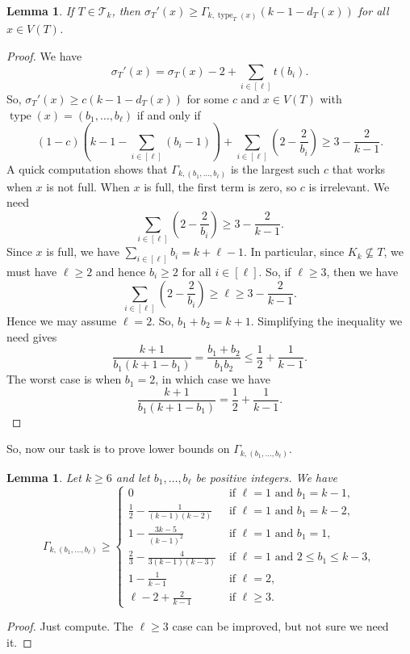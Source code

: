 \documentclass[12pt]{article}
\theoremstyle{plain}
\newtheorem{lem}[thm]{Lemma}
\theoremstyle{definition}
\theoremstyle{remark}
\newcommand{\fancy}[1]{\mathcal{#1}}
\newcommand{\T}{\fancy{T}}
\newcommand{\irange}[1]{\left[#1\right]}
\newcommand{\parens}[1]{\left( #1 \right)}
\newcommand{\type}{\operatorname{type}}
\begin{document}
\begin{lem}\label{PrimeGammaBound}
	If $T \in \T_k$, then $\sigma_T'(x) \ge \Gamma_{k,\type_T(x)}\parens{k - 1 - d_T(x)}$ for all $x \in V(T)$.
\end{lem}
\begin{proof}
	We have
	\[\sigma_T'(x) = \sigma_T(x) - 2 + \sum_{i \in \irange{\ell}}t(b_i).\]
	So, $\sigma_T'(x) \ge c\parens{k - 1 - d_T(x)}$ for some $c$ and $x \in V(T)$ with $\type(x) = (b_1, \ldots, b_\ell)$ if and only if
	\[(1-c)\parens{k - 1 - \sum_{i\in\irange{\ell}} (b_i-1)} + \sum_{i \in \irange{\ell}} \parens{2 - \frac{2}{b_i}} \ge 3 - \frac{2}{k-1}.\]
	A quick computation shows that $\Gamma_{k,(b_1,\ldots,b_{\ell})}$ is the largest such $c$ that works when $x$ is not full.  When $x$ is full, the first term is zero, so $c$ is irrelevant. We need
	\[\sum_{i \in \irange{\ell}} \parens{2 - \frac{2}{b_i}} \ge 3 - \frac{2}{k-1}.\]
	Since $x$ is full, we have $\sum_{i \in \irange{\ell}} b_i = k + \ell - 1$. In particular, since $K_k \not \subseteq T$, we must have $\ell \ge 2$ and hence $b_i \ge 2$ for all $i \in \irange{\ell}$.  So, if $\ell \ge 3$, then we have
	\[\sum_{i \in \irange{\ell}} \parens{2 - \frac{2}{b_i}} \ge \ell \ge 3 - \frac{2}{k-1}.\]
	Hence we may assume $\ell = 2$.  So, $b_1 + b_2 = k + 1$.  Simplifying the inequality we need gives
	\[\frac{k+1}{b_1(k + 1 - b_1)} = \frac{b_1 + b_2}{b_1b_2} \le \frac12 + \frac{1}{k-1}.\]
	The worst case is when $b_1 = 2$, in which case we have
	\[\frac{k+1}{b_1(k + 1 - b_1)} = \frac12 + \frac{1}{k-1}.\] 
\end{proof}

So, now our task is to prove lower bounds on $\Gamma_{k,(b_1,\ldots,b_{\ell})}$.  

\begin{lem}\label{GammaBound}
	Let $k \ge 6$ and let $b_1, \ldots, b_\ell$ be positive integers.  We have
	\[\Gamma_{k,(b_1,\ldots,b_{\ell})} \ge \begin{cases}
	0 & \text{ if } \ell = 1 \text{ and } b_1 = k-1,\\
	\frac12 - \frac{1}{(k-1)(k-2)} & \text{ if } \ell = 1 \text{ and } b_1 = k-2,\\
	1 - \frac{3k-5}{(k-1)^2} & \text{ if } \ell = 1 \text{ and } b_1 = 1,\\
	\frac23 - \frac{4}{3(k-1)(k-3)} & \text{ if } \ell = 1 \text{ and } 2 \le b_1 \le k-3,\\
	1 - \frac{1}{k-1} & \text{ if } \ell = 2,\\
	\ell - 2 + \frac{2}{k-1} & \text{ if } \ell \ge 3.
	\end{cases}\]
\end{lem}
\begin{proof}
	Just compute. The $\ell \ge 3$ case can be improved, but not sure we need it.
\end{proof}
\end{document}

